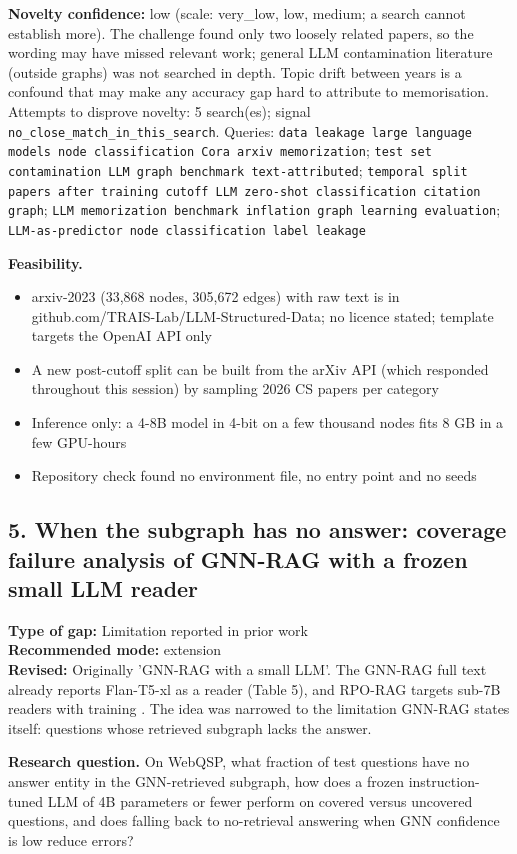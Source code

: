 \documentclass[11pt,a4paper]{article}
\begin{document}
\textbf{Novelty confidence:} low (scale: very\_low, low, medium; a search cannot establish more). The challenge found only two loosely related papers, so the wording may have missed relevant work; general LLM contamination literature (outside graphs) was not searched in depth. Topic drift between years is a confound that may make any accuracy gap hard to attribute to memorisation.
Attempts to disprove novelty: 5 search(es); signal \texttt{no\_close\_match\_in\_this\_search}. Queries: \texttt{data leakage large language models node classification Cora arxiv memorization}; \texttt{test set contamination LLM graph benchmark text-attributed}; \texttt{temporal split papers after training cutoff LLM zero-shot classification citation graph}; \texttt{LLM memorization benchmark inflation graph learning evaluation}; \texttt{LLM-as-predictor node classification label leakage}

\textbf{Feasibility.}
\begin{itemize}
\item [V] arxiv-2023 (33,868 nodes, 305,672 edges) with raw text is in github.com/TRAIS-Lab/LLM-Structured-Data; no licence stated; template targets the OpenAI API only
\item [E] A new post-cutoff split can be built from the arXiv API (which responded throughout this session) by sampling 2026 CS papers per category
\item [E] Inference only: a 4-8B model in 4-bit on a few thousand nodes fits 8 GB in a few GPU-hours
\item [V] Repository check found no environment file, no entry point and no seeds
\end{itemize}

\subsection{5. When the subgraph has no answer: coverage failure analysis of GNN-RAG with a frozen small LLM reader}
\textbf{Type of gap:} Limitation reported in prior work\\
\textbf{Recommended mode:} extension\\
\textbf{Revised:} Originally 'GNN-RAG with a small LLM'. The GNN-RAG full text already reports Flan-T5-xl as a reader (Table 5), and RPO-RAG targets sub-7B readers with training \cite{um2026rporag}. The idea was narrowed to the limitation GNN-RAG states itself: questions whose retrieved subgraph lacks the answer.

\textbf{Research question.} On WebQSP, what fraction of test questions have no answer entity in the GNN-retrieved subgraph, how does a frozen instruction-tuned LLM of 4B parameters or fewer perform on covered versus uncovered questions, and does falling back to no-retrieval answering when GNN confidence is low reduce errors?
\end{document}
